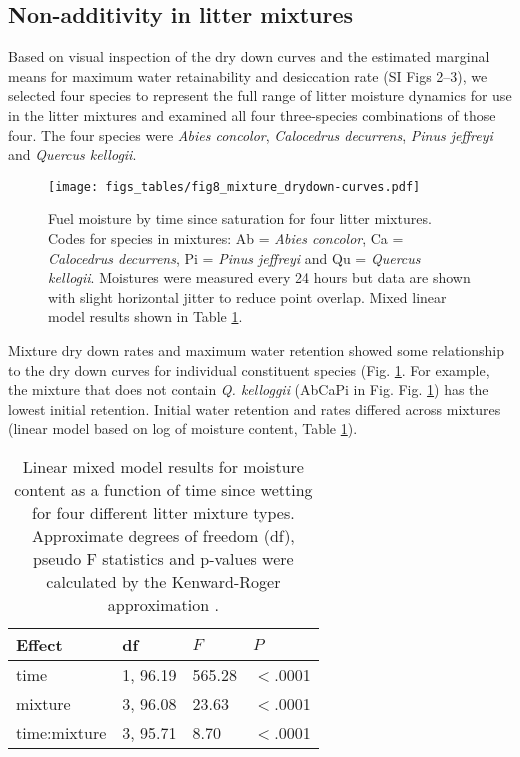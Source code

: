 \documentclass[fire,article,submit,moreauthors,pdftex]{Definitions/mdpi}
\begin{document}
\subsection{Non-additivity in  litter mixtures}

Based on visual inspection of the dry down curves and the estimated marginal means for maximum water retainability and desiccation rate (SI Figs 2--3), we selected four species to represent the full range of litter moisture dynamics for use in the litter mixtures and examined all four three-species combinations of those four. The four species were \emph{Abies concolor}, \emph{Calocedrus decurrens}, \emph{Pinus jeffreyi} and \emph{Quercus kellogii}.

\begin{figure}[H]
  \centering
\texttt{[image: figs\_tables/fig8\_mixture\_drydown-curves.pdf]}
\caption{Fuel moisture by time since saturation for four litter mixtures.  Codes for species in mixtures: Ab = \emph{Abies concolor}, Ca = \emph{Calocedrus decurrens}, Pi = \emph{Pinus jeffreyi} and Qu = \emph{Quercus kellogii}. Moistures were measured every 24 hours but data are shown with slight horizontal jitter to reduce point overlap. Mixed linear model results shown in Table \ref{tab:mixtures_drydown}.}
  \label{fig:mixture_dry_down}
\end{figure}

Mixture dry down rates and maximum water retention showed some relationship to the dry down curves for individual constituent species (Fig. \ref{fig:mixture_dry_down}. For example, the mixture that does not contain \emph{Q. kelloggii} (AbCaPi in Fig. Fig. \ref{fig:mixture_dry_down}) has the lowest initial retention. Initial water retention and rates differed across mixtures (linear model based on log of moisture content, Table \ref{tab:mixtures_drydown}).

\begin{table}[H]
  \caption{Linear mixed model results for moisture content as a function of time since
    wetting for four different litter mixture types. Approximate degrees of freedom (df), pseudo F statistics and p-values
    were calculated by the Kenward-Roger approximation
    \cite{Kenward_Roger-1997}.}
  \label{tab:mixtures_drydown}
\centering

\begin{tabular}{llll}
  \toprule
Effect & df & $F$ & $P$ \\ 
  \midrule
time & 1, 96.19 & 565.28 & $<$.0001 \\ 
  mixture & 3, 96.08 & 23.63 & $<$.0001 \\ 
  time:mixture & 3, 95.71 & 8.70 & $<$.0001 \\ 
   \bottomrule
\end{tabular}
\end{table}
\end{document}
